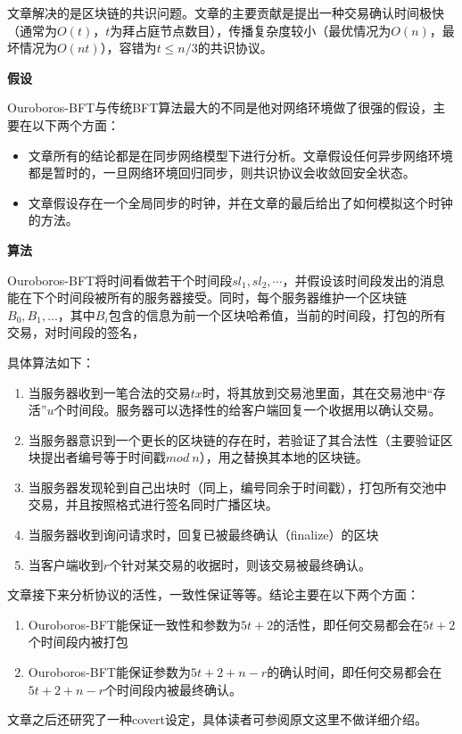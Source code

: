 文章解决的是区块链的共识问题。文章的主要贡献是提出一种交易确认时间极快（通常为$O(t)$，$t$为拜占庭节点数目），传播复杂度较小（最优情况为$O(n)$，最坏情况为$O(nt)$），容错为$t\leq n/3$的共识协议。

\textbf{假设}

Ouroboros-BFT与传统BFT算法最大的不同是他对网络环境做了很强的假设，主要在以下两个方面：
\begin{itemize}
	\item 文章所有的结论都是在同步网络模型下进行分析。文章假设任何异步网络环境都是暂时的，一旦网络环境回归同步，则共识协议会收敛回安全状态。
	\item 文章假设存在一个全局同步的时钟，并在文章的最后给出了如何模拟这个时钟的方法。
\end{itemize}

\textbf{算法}

Ouroboros-BFT将时间看做若干个时间段$sl_1,sl_2,\cdots$，并假设该时间段发出的消息能在下个时间段被所有的服务器接受。同时，每个服务器维护一个区块链$B_0,B_1,...$，其中$B_i$包含的信息为前一个区块哈希值，当前的时间段，打包的所有交易，对时间段的签名，

具体算法如下：
\begin{enumerate}
	\item 当服务器收到一笔合法的交易$tx$时，将其放到交易池里面，其在交易池中“存活”$u$个时间段。服务器可以选择性的给客户端回复一个收据用以确认交易。
	\item 当服务器意识到一个更长的区块链的存在时，若验证了其合法性（主要验证区块提出者编号等于时间戳$mod~n$），用之替换其本地的区块链。
	\item 当服务器发现轮到自己出块时（同上，编号同余于时间戳），打包所有交池中交易，并且按照格式进行签名同时广播区块。
	\item 当服务器收到询问请求时，回复已被最终确认（finalize）的区块
	\item 当客户端收到$r$个针对某交易的收据时，则该交易被最终确认。
\end{enumerate}
文章接下来分析协议的活性，一致性保证等等。结论主要在以下两个方面：
\begin{enumerate}
	\item Ouroboros-BFT能保证一致性和参数为$5t+2$的活性，即任何交易都会在$5t+2$个时间段内被打包
	\item Ouroboros-BFT能保证参数为$5t+2+n-r$的确认时间，即任何交易都会在$5t+2+n-r$个时间段内被最终确认。
\end{enumerate}
文章之后还研究了一种covert设定\cite{aumann2007security}，具体读者可参阅原文这里不做详细介绍。

